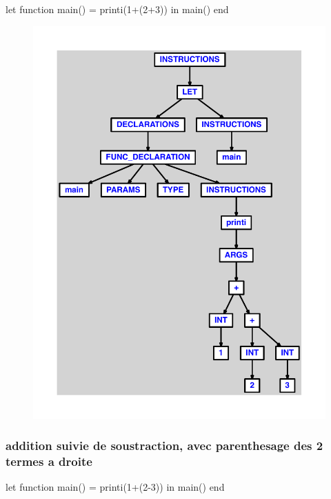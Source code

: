 \documentclass{article}
\begin{document}
\begin{verbatimtab}
let function main() = printi(1+(2+3)) in main() end
\end{verbatimtab}
\begin{figure}[H]\centering\includegraphics[max width=\textwidth]{ast/ast_87.pdf}\end{figure}\subsubsection{addition suivie de soustraction, avec parenthesage des 2 termes a droite}
\begin{verbatimtab}
let function main() = printi(1+(2-3)) in main() end
\end{verbatimtab}
\end{document}
